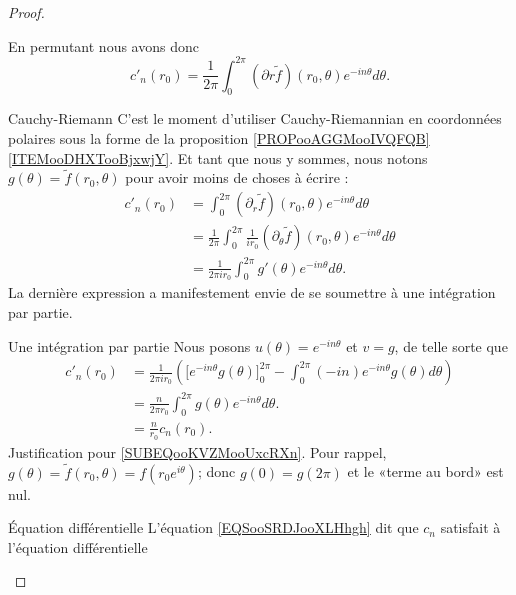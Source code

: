 \begin{proof}
\begin{subproof}
        En permutant nous avons donc
        \begin{equation}
            c'_n(r_0)=\frac{1}{ 2\pi }\int_0^{2\pi}(\partial r\tilde f)(r_0,\theta) e^{-in\theta}d\theta.
        \end{equation}
    \item[Cauchy-Riemann]
        C'est le moment d'utiliser Cauchy-Riemannian en coordonnées polaires sous la forme de la proposition \ref{PROPooAGGMooIVQFQB}\ref{ITEMooDHXTooBjxwjY}. Et tant que nous y sommes, nous notons \( g(\theta)=\tilde f(r_0,\theta)\) pour avoir moins de choses à écrire :
        \begin{subequations}
            \begin{align}
                c'_n(r_0)&=\int_0^{2\pi}(\partial_r\tilde f)(r_0,\theta) e^{-in\theta}d\theta\\
                &=\frac{1}{ 2\pi }\int_0^{2\pi}\frac{1}{ ir_0 }(\partial_{\theta}\tilde f)(r_0,\theta) e^{-in\theta}d\theta\\
                &=\frac{1}{ 2\pi ir_0 }\int_{0}^{2\pi}g'(\theta) e^{-in\theta}d\theta.
            \end{align}
        \end{subequations}
        La dernière expression a manifestement envie de se soumettre à une intégration par partie.
    \item[Une intégration par partie]
        Nous posons \( u(\theta)= e^{-in\theta}\) et \( v=g\), de telle sorte que
        \begin{subequations}        \label{EQSooSRDJooXLHhgh}
            \begin{align}
            c'_n(r_0)&=\frac{1}{ 2\pi i r_0 }\left( \big[ e^{-in\theta}g(\theta)\big]_0^{2\pi}-\int_0^{2\pi}(-in) e^{-in\theta}g(\theta)d\theta \right)\\
            &=\frac{n}{ 2\pi r_0 }\int_0^{2\pi}g(\theta) e^{-in\theta}d\theta.      \label{SUBEQooKVZMooUxcRXn}\\
            &=\frac{ n }{ r_0 }c_n(r_0).
            \end{align}
        \end{subequations}
        Justification pour \eqref{SUBEQooKVZMooUxcRXn}. Pour rappel, \( g(\theta)=\tilde f(r_0,\theta)=f(r_0 e^{i\theta})\); donc \( g(0)=g(2\pi)\) et le «terme au bord» est nul.
    \item[Équation différentielle]
        L'équation \eqref{EQSooSRDJooXLHhgh} dit que \( c_n\) satisfait à l'équation différentielle
        \begin{equation}

\end{equation}
\end{subproof}
\end{proof}
